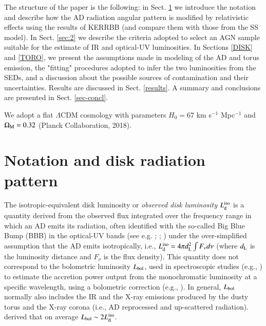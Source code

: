 \documentclass[]{aa}
\begin{document}
The structure of the paper is the following: in Sect. \ref{notation} we introduce the notation and describe how the AD radiation angular pattern is modified by relativistic effects using the results of KERRBB (and compare them with those from the SS model). In Sect. \ref{sec:2} we describe the criteria adopted to select an AGN sample suitable for the estimate of IR and optical-UV luminosities. In Sections \ref{DISK} and \ref{TORO}, we present the assumptions made in modeling of the AD and torus emission, the "fitting" procedures adopted to infer the two luminosities from the SEDs, and a discussion about the possible sources of contamination and their uncertainties. Results are discussed in Sect. \ref{results}. A summary and conclusions are presented in Sect. \ref{sec-concl}.

We adopt a flat $\Lambda$CDM cosmology with parameters $H_0=67$ km s$^{-1}$ Mpc$^{-1}$ and $\Omega_{\rm M}=0.32$ (Planck Collaboration, 2018).



















\section{Notation and disk radiation pattern}\label{notation}

The isotropic-equivalent disk luminosity or \textit{observed disk luminosity} $L^{\rm iso}_{\rm d}$ is a quantity derived from the observed flux integrated over the frequency range in which an AD emits its radiation, often identified with the so-called Big Blue Bump (BBB) in the optical-UV bands (see e.g. \citealt{Cunnin}; \citealt{Caldero}; \citealt{Campiti}) under the over-simplified assumption that the AD emits isotropically, i.e., $L^{\rm iso}_{\rm d} = 4 \pi d^2_{\rm L} \int F_\nu d\nu$ (where $d_{\rm L}$ is the luminosity distance and $F_{\nu}$ is the flux density). This quantity does not correspond to the bolometric luminosity $L_{\rm bol}$, used in spectroscopic studies (e.g., \citealt{Shenetal11}) to estimate the accretion power output from the monochromatic luminosity at a specific wavelength, using a bolometric correction (e.g., \citealt{Rich06}). In general, $L_{\rm bol}$ normally also includes the IR and the X-ray emissions produced by the dusty torus and the X-ray corona (i.e., AD reprocessed and up-scattered radiation). \citet{Caldero} derived that on average $L_{\rm bol} \sim 2 L^{\rm iso}_{\rm d}$. 
\end{document}
